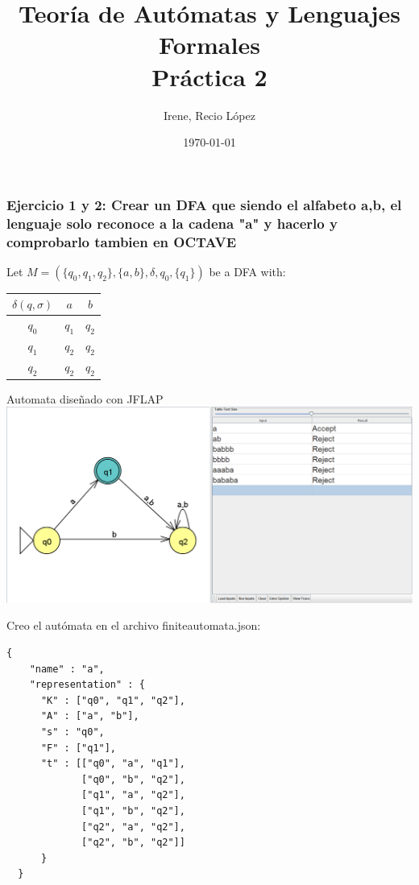 \documentclass[fleqn, 10pt]{article}
\title{Teoría de Autómatas y Lenguajes Formales\\[.4\baselineskip]Práctica 2}
\author{Irene, Recio López}
\date{\today}
\theoremstyle{plain}
\theoremstyle{definition}
\begin{document}
\maketitle

\subsubsection*{Ejercicio 1 y 2: Crear un DFA que siendo el alfabeto {a,b}, el lenguaje solo reconoce a la cadena "a" y hacerlo y comprobarlo tambien en OCTAVE}
\begin{center}
Let $M=(\{q_0,q_1,q_2\}, \{a,b\}, \delta, q_0, \{q_1\})$ be a DFA with:\\

\begin{table}[h!]
\begin{tabular}{c|c|c}
 $\delta(q,\sigma)$ & $a$ & $b$
\\
 \hline
 $q_0$& $q_1$ & $q_2$\\
  \hline
  $q_1$& $q_2$ & $q_2$\\
  \hline
  $q_2$& $q_2$ & $q_2$
\end{tabular}
\end{table} 
\end{center}
Automata diseñado con JFLAP
\\
	\centering
	\includegraphics[scale=0.2]{resultados}

\begin{flushleft}
Creo el autómata en el archivo finiteautomata.json:



\end{flushleft}
\begin{verbatim}
{
    "name" : "a",
    "representation" : {
      "K" : ["q0", "q1", "q2"],
      "A" : ["a", "b"],
      "s" : "q0",
      "F" : ["q1"],
      "t" : [["q0", "a", "q1"],
             ["q0", "b", "q2"],
             ["q1", "a", "q2"],
             ["q1", "b", "q2"],
             ["q2", "a", "q2"],
             ["q2", "b", "q2"]]
      }
  }
\end{verbatim}
\end{document}

